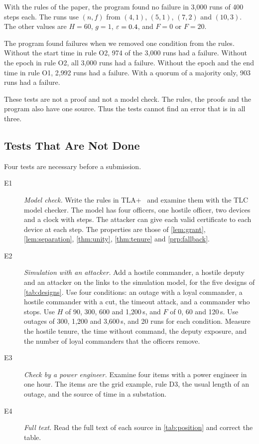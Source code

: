 With the rules of the paper, the program found no failure in 3{,}000 runs of 400 steps
each. The runs use $(n, f)$ from $(4,1)$, $(5,1)$, $(7,2)$ and $(10,3)$. The other values
are $H = 60$, $g = 1$, $\varepsilon = 0.4$, and $F = 0$ or $F = 20$.

The program found failures when we removed one condition from the rules. Without the start
time in rule O2, 974 of the 3{,}000 runs had a failure. Without the epoch in rule O2, all
3{,}000 runs had a failure. Without the epoch and the end time in rule O1, 2{,}992 runs
had a failure. With a quorum of a majority only, 903 runs had a failure.

These tests are not a proof and not a model check. The rules, the proofs
and the program also have one source. Thus the tests cannot find an error that is in all
three.

\subsection{Tests That Are Not Done}
\label{sec:plan}

Four tests are necessary before a submission. 

\begin{description}
  \item[E1] \emph{Model check.} Write the rules in TLA+~\cite{tlaplus} and examine them with the
  TLC model checker. The model has four officers, one hostile officer, two devices and a
  clock with steps. The attacker can give each valid certificate to each device at each
  step. The properties are those of \cref{lem:grant}, \cref{lem:separation},
  \cref{thm:unity}, \cref{thm:tenure} and \cref{prp:fallback}.
  \item[E2] \emph{Simulation with an attacker.} Add a hostile commander, a hostile deputy and an
  attacker on the links to the simulation model, for the five designs of
  \cref{tab:designs}. Use four conditions: an outage with a loyal commander, a hostile
  commander with a cut, the timeout attack, and a commander who stops. Use $H$ of 90, 300, 600 and
  1{,}200\,s, and $F$ of 0, 60 and 120\,s. Use outages of 300, 1{,}200 and 3{,}600\,s, and
  20 runs for each condition. Measure the hostile tenure, the time without command, the
  deputy exposure, and the number of loyal commanders that the officers remove.
  \item[E3] \emph{Check by a power engineer.} Examine four items with a power engineer in
  one hour. The items are the grid example, rule D3, the usual length of an outage, and the
  source of time in a substation.
  \item[E4] \emph{Full text.} Read the full text of each source in \cref{tab:position} and
  correct the table.
\end{description}

